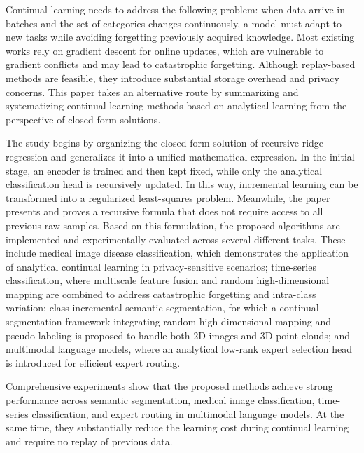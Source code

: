 
\begin{abstracten}

Continual learning needs to address the following problem: when data arrive in batches and the set of categories changes continuously, a model must adapt to new tasks while avoiding forgetting previously acquired knowledge. Most existing works rely on gradient descent for online updates, which are vulnerable to gradient conflicts and may lead to catastrophic forgetting. Although replay-based methods are feasible, they introduce substantial storage overhead and privacy concerns. This paper takes an alternative route by summarizing and systematizing continual learning methods based on analytical learning from the perspective of closed-form solutions.

The study begins by organizing the closed-form solution of recursive ridge regression and generalizes it into a unified mathematical expression. In the initial stage, an encoder is trained and then kept fixed, while only the analytical classification head is recursively updated. In this way, incremental learning can be transformed into a regularized least-squares problem. Meanwhile, the paper presents and proves a recursive formula that does not require access to all previous raw samples. Based on this formulation, the proposed algorithms are implemented and experimentally evaluated across several different tasks. These include medical image disease classification, which demonstrates the application of analytical continual learning in privacy-sensitive scenarios; time-series classification, where multiscale feature fusion and random high-dimensional mapping are combined to address catastrophic forgetting and intra-class variation; class-incremental semantic segmentation, for which a continual segmentation framework integrating random high-dimensional mapping and pseudo-labeling is proposed to handle both 2D images and 3D point clouds; and multimodal language models, where an analytical low-rank expert selection head is introduced for efficient expert routing.

Comprehensive experiments show that the proposed methods achieve strong performance across semantic segmentation, medical image classification, time-series classification, and expert routing in multimodal language models. At the same time, they substantially reduce the learning cost during continual learning and require no replay of previous data.

\end{abstracten}
